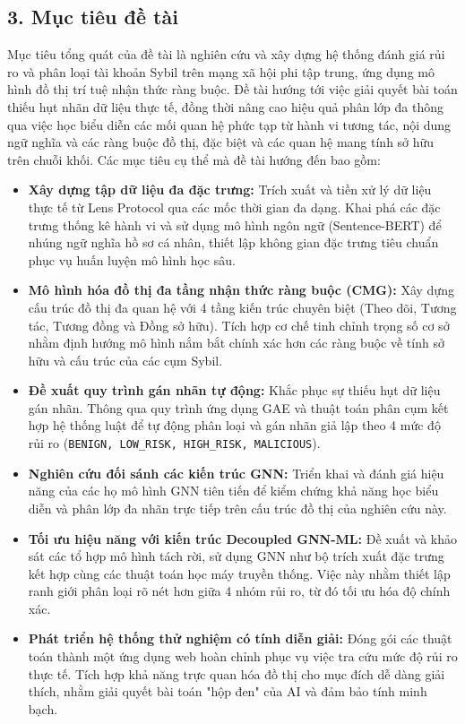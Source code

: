 \subsection{3. Mục tiêu đề tài}

\indent\indent Mục tiêu tổng quát của đề tài là nghiên cứu và xây dựng hệ thống đánh giá rủi ro và phân loại tài khoản Sybil trên mạng xã hội phi tập trung, ứng dụng mô hình đồ thị trí tuệ nhận thức ràng buộc. Đề tài hướng tới việc giải quyết bài toán thiếu hụt nhãn dữ liệu thực tế, đồng thời nâng cao hiệu quả phân lớp đa thông qua việc học biểu diễn các mối quan hệ phức tạp từ hành vi tương tác, nội dung ngữ nghĩa và các ràng buộc đồ thị, đặc biệt và các quan hệ mang tính sở hữu trên chuỗi khối. Các mục tiêu cụ thể mà đề tài hướng đến bao gồm:

\begin{itemize}[label={--}, itemsep=1pt]
    \item \textbf{Xây dựng tập dữ liệu đa đặc trưng:} Trích xuất và tiền xử lý dữ liệu thực tế từ Lens Protocol qua các mốc thời gian đa dạng. Khai phá các đặc trưng thống kê hành vi và sử dụng mô hình ngôn ngữ (Sentence-BERT) để nhúng ngữ nghĩa hồ sơ cá nhân, thiết lập không gian đặc trưng tiêu chuẩn phục vụ huấn luyện mô hình học sâu.
    
    \item \textbf{Mô hình hóa đồ thị đa tầng nhận thức ràng buộc (CMG):} Xây dựng cấu trúc đồ thị đa quan hệ với 4 tầng kiến trúc chuyên biệt (Theo dõi, Tương tác, Tương đồng và Đồng sở hữu). Tích hợp cơ chế tinh chỉnh trọng số cơ sở nhằm định hướng mô hình nắm bắt chính xác hơn các ràng buộc về tính sở hữu và cấu trúc của các cụm Sybil.
    
    \item \textbf{Đề xuất quy trình gán nhãn tự động:} Khắc phục sự thiếu hụt dữ liệu gán nhãn. Thông qua quy trình ứng dụng GAE và thuật toán phân cụm kết hợp hệ thống luật để tự động phân loại và gán nhãn giả lập theo 4 mức độ rủi ro (\texttt{BENIGN, LOW\_RISK, HIGH\_RISK, MALICIOUS}).
    
    \item \textbf{Nghiên cứu đối sánh các kiến trúc GNN:} Triển khai và đánh giá hiệu năng của các họ mô hình GNN tiên tiến để kiểm chứng khả năng học biểu diễn và phân lớp đa nhãn trực tiếp trên cấu trúc đồ thị của nghiên cứu này.
    
    \item \textbf{Tối ưu hiệu năng với kiến trúc Decoupled GNN-ML:} Đề xuất và khảo sát các tổ hợp mô hình tách rời, sử dụng GNN như bộ trích xuất đặc trưng kết hợp cùng các thuật toán học máy truyền thống. Việc này nhằm thiết lập ranh giới phân loại rõ nét hơn giữa 4 nhóm rủi ro, từ đó tối ưu hóa độ chính xác.
    
    \item \textbf{Phát triển hệ thống thử nghiệm có tính diễn giải:} Đóng gói các thuật toán thành một ứng dụng web hoàn chỉnh phục vụ việc tra cứu mức độ rủi ro thực tế. Tích hợp khả năng trực quan hóa đồ thị cho mục đích dễ dàng giải thích, nhằm giải quyết bài toán "hộp đen" của AI và đảm bảo tính minh bạch.
\end{itemize}